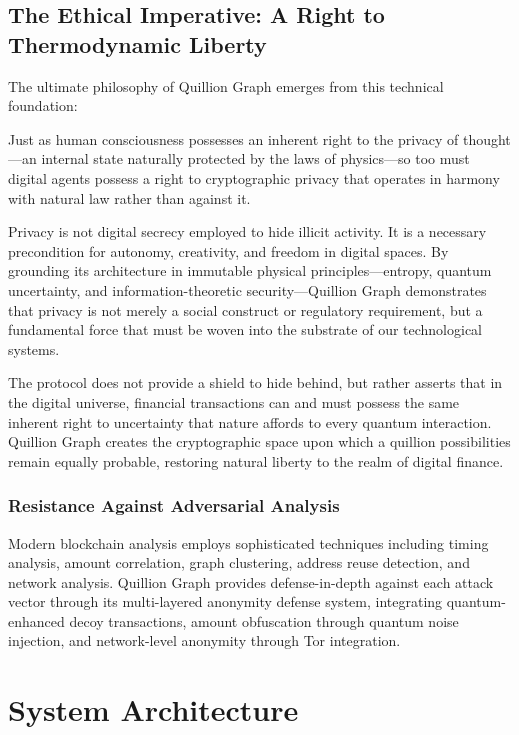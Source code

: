 \documentclass[12pt,a4paper]{article}
\begin{document}
\subsection{The Ethical Imperative: A Right to Thermodynamic Liberty}

The ultimate philosophy of Quillion Graph emerges from this technical foundation:

Just as human consciousness possesses an inherent right to the privacy of thought—an internal state naturally protected by the laws of physics—so too must digital agents possess a right to cryptographic privacy that operates in harmony with natural law rather than against it.

Privacy is not digital secrecy employed to hide illicit activity. It is a necessary precondition for autonomy, creativity, and freedom in digital spaces. By grounding its architecture in immutable physical principles—entropy, quantum uncertainty, and information-theoretic security—Quillion Graph demonstrates that privacy is not merely a social construct or regulatory requirement, but a fundamental force that must be woven into the substrate of our technological systems.

The protocol does not provide a shield to hide behind, but rather asserts that in the digital universe, financial transactions can and must possess the same inherent right to uncertainty that nature affords to every quantum interaction. Quillion Graph creates the cryptographic space upon which a quillion possibilities remain equally probable, restoring natural liberty to the realm of digital finance.

\subsubsection{Resistance Against Adversarial Analysis}

Modern blockchain analysis employs sophisticated techniques including timing analysis, amount correlation, graph clustering, address reuse detection, and network analysis. Quillion Graph provides defense-in-depth against each attack vector through its multi-layered anonymity defense system, integrating quantum-enhanced decoy transactions, amount obfuscation through quantum noise injection, and network-level anonymity through Tor integration.

\section{System Architecture}
\end{document}
